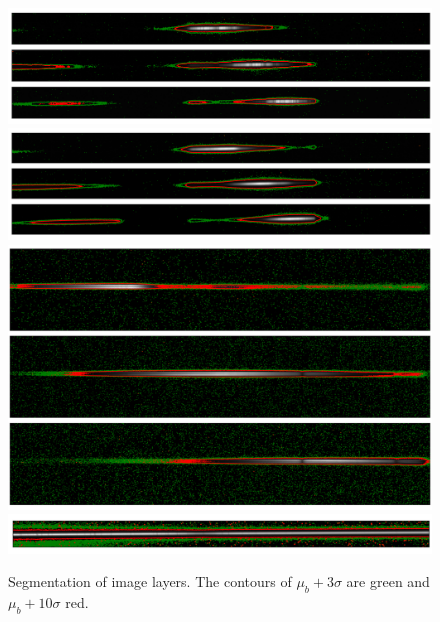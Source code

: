 \documentclass[10pt,a4paper,notitlepage]{article}
\begin{document}
	
	\begin{figure}[h]
		\includegraphics[width=\columnwidth]{img/alpori_segm.png} \\
		\includegraphics[width=\columnwidth]{img/betori_segm.png} \\
		\includegraphics[width=\columnwidth]{img/alpcma_segm.png} \\
		\includegraphics[width=\columnwidth]{img/alpleo_segm.png}		
		\caption[segmentation]%
		{Segmentation of image layers.
			The contours of $\mu_b + 3 \sigma$ are green and $\mu_b + 10 \sigma$ red.}
		\label{fig:segmentation}
	\end{figure}
\end{document}
